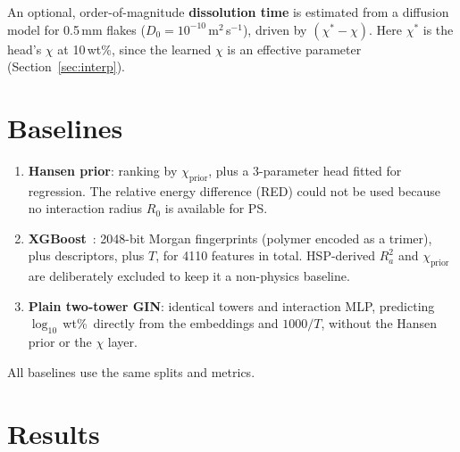\documentclass[11pt,a4paper]{article}
\newcommand{\wt}{wt\%}
\begin{document}
An optional, order-of-magnitude \textbf{dissolution time} is estimated from a diffusion model for
0.5\,mm flakes ($D_0=10^{-10}$\,m$^2$\,s$^{-1}$), driven by $(\chi^*-\chi)$. Here $\chi^*$ is the head's
$\chi$ at 10\,\wt, since the learned $\chi$ is an effective parameter (Section~\ref{sec:interp}).

\section{Baselines}
\begin{enumerate}
\item \textbf{Hansen prior}: ranking by $\chi_{\text{prior}}$, plus a 3-parameter head fitted for
regression. The relative energy difference (RED) could not be used because no interaction radius $R_0$
is available for PS.
\item \textbf{XGBoost}~\cite{xgb}: 2048-bit Morgan fingerprints (polymer encoded as a trimer), plus
descriptors, plus $T$, for 4110 features in total. HSP-derived $R_a^2$ and $\chi_{\text{prior}}$ are
deliberately excluded to keep it a non-physics baseline.
\item \textbf{Plain two-tower GIN}: identical towers and interaction MLP, predicting $\log_{10}$\,\wt\
directly from the embeddings and $1000/T$, without the Hansen prior or the $\chi$ layer.
\end{enumerate}
All baselines use the same splits and metrics.

\section{Results}
\end{document}
